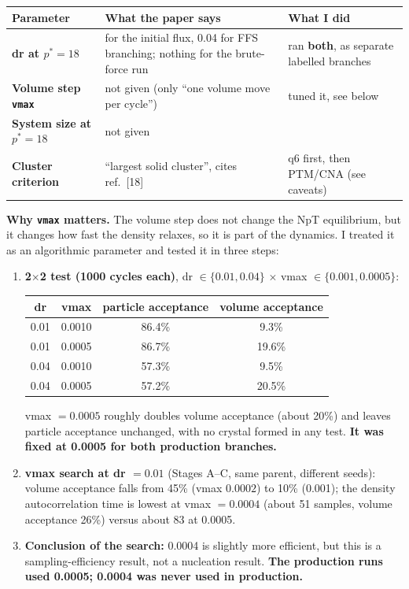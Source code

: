 \documentclass[10.5pt,a4paper]{article}
\newcommand{\ps}{p^{*}}
\begin{document}
\begin{center}
\small
\begin{tabularx}{\textwidth}{@{}>{\bfseries}l >{\raggedright\arraybackslash}X >{\raggedright\arraybackslash}X@{}}
\toprule
Parameter & What the paper says & What I did\\
\midrule
dr at $\ps=18$ & 0.01 for the initial flux, 0.04 for FFS branching; nothing for the brute-force run & ran \textbf{both}, as separate labelled branches\\
Volume step \texttt{vmax} & not given (only ``one volume move per cycle'') & tuned it, see below\\
System size at $\ps=18$ & not given & 1000\\
Cluster criterion & ``largest solid cluster'', cites ref.\ [18] & q6 first, then PTM/CNA (see caveats)\\
\bottomrule
\end{tabularx}
\end{center}

\textbf{Why \texttt{vmax} matters.} The volume step does not change the NpT equilibrium, but it changes how fast the density relaxes, so it is part of the dynamics. I treated it as an algorithmic parameter and tested it in three steps:

\begin{enumerate}
\item \textbf{2$\times$2 test (1000 cycles each)}, dr $\in\{0.01,0.04\}$ $\times$ vmax $\in\{0.001,0.0005\}$:
\begin{center}
\small
\begin{tabular}{@{}cccc@{}}
\toprule
dr & vmax & particle acceptance & volume acceptance\\
\midrule
0.01 & 0.0010 & 86.4\% & 9.3\%\\
0.01 & 0.0005 & 86.7\% & 19.6\%\\
0.04 & 0.0010 & 57.3\% & 9.5\%\\
0.04 & 0.0005 & 57.2\% & 20.5\%\\
\bottomrule
\end{tabular}
\end{center}
vmax $=0.0005$ roughly doubles volume acceptance (about 20\%) and leaves particle acceptance unchanged, with no crystal formed in any test. \textbf{It was fixed at 0.0005 for both production branches.}
\item \textbf{vmax search at dr $=0.01$} (Stages A--C, same parent, different seeds): volume acceptance falls from 45\% (vmax $0.0002$) to 10\% (0.001); the density autocorrelation time is lowest at vmax $=0.0004$ (about 51 samples, volume acceptance 26\%) versus about 83 at 0.0005.
\item \textbf{Conclusion of the search:} 0.0004 is slightly more efficient, but this is a sampling-efficiency result, not a nucleation result. \textbf{The production runs used 0.0005; 0.0004 was never used in production.}
\end{enumerate}
\end{document}
